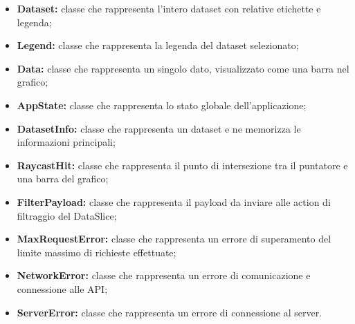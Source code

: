 \begin{itemize}
    \item \textbf{Dataset:} classe che rappresenta l'intero dataset con relative etichette e legenda;
    \item \textbf{Legend:} classe che rappresenta la legenda del dataset selezionato;
    \item \textbf{Data:} classe che rappresenta un singolo dato, visualizzato come una barra nel grafico;
    \item \textbf{AppState:} classe che rappresenta lo stato globale dell'applicazione;
    \item \textbf{DatasetInfo:} classe che rappresenta un dataset e ne memorizza le informazioni principali;
    \item \textbf{RaycastHit:} classe che rappresenta il punto di intersezione tra il puntatore e una barra del grafico;
    \item \textbf{FilterPayload:} classe che rappresenta il payload da inviare alle action di filtraggio del DataSlice;
    \item \textbf{MaxRequestError:} classe che rappresenta un errore di superamento del limite massimo di richieste effettuate;
    \item \textbf{NetworkError:} classe che rappresenta un errore di comunicazione e connessione alle API;
    \item \textbf{ServerError:} classe che rappresenta un errore di connessione al server.
\end{itemize}
